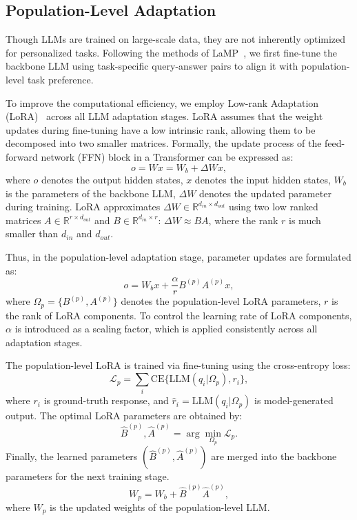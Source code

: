 \documentclass[11pt]{article}
\begin{document}
\subsection{Population-Level Adaptation}
Though LLMs are trained on large-scale data, they are not inherently optimized for personalized tasks. 
Following the methods of LaMP~\cite{salemi-etal-2024-lamp}, we first fine-tune the backbone LLM using task-specific query-answer pairs to align it with population-level task preference.

To improve the computational efficiency, we employ Low-rank Adaptation (LoRA)~\cite{hu2022lora} across all LLM adaptation stages.
LoRA assumes that the weight updates during fine-tuning have a low intrinsic rank, allowing them to be decomposed into two smaller matrices. 
Formally, the update process of the feed-forward network (FFN) block in a Transformer can be expressed as:
\begin{equation}
    o = Wx = W_b + \Delta Wx,
\end{equation}
where $o$ denotes the output hidden states, $x$ denotes the input hidden states, $W_b$ is the parameters of the backbone LLM, $\Delta W$ denotes the updated parameter during training.
LoRA approximates $\Delta W \in \mathbb{R}^{d_{in} \times d_{out}}$ using two low ranked matrices $A \in \mathbb{R}^{r \times d_{out}}$ and $B \in \mathbb{R}^{d_{in} \times r}$: $\Delta W \approx BA$, where the rank $r$ is much smaller than $d_{in}$ and $d_{out}$. 

Thus, in the population-level adaptation stage, parameter updates are formulated as:
\begin{equation}
    o = W_b x + \frac{\alpha}{r} B^{(p)} A^{(p)} x,
\end{equation}
where $\Omega_p = \{B^{(p)},A^{(p)}\}$ denotes the population-level LoRA parameters, $r$ is the rank of LoRA components.
To control the learning rate of LoRA components, $\alpha$ is introduced as a scaling factor, which is applied consistently across all adaptation stages.

The population-level LoRA is trained via fine-tuning using the cross-entropy loss:
\begin{equation}
\mathcal{L}_p = \sum_i\text{CE}\{\text{LLM}(q_i|\Omega_p),r_i\}, 
\end{equation}
where $r_i$ is ground-truth response, and $\hat{r}_i=\text{LLM}(q_i|\Omega_p)$ is model-generated output. 
The optimal LoRA parameters are obtained by:
\begin{equation}
\hat{B}^{(p)}, \hat{A}^{(p)} = \arg\min_{\Omega_p} \mathcal{L}_p.
\end{equation}
Finally, the learned parameters $(\hat{B}^{(p)}, \hat{A}^{(p)})$ are merged into the backbone parameters for the next training stage. 
\begin{equation}
    W_p = W_b + \hat{B}^{(p)} \hat{A}^{(p)},
\end{equation}
where $W_p$ is the updated weights of the population-level LLM. 
\end{document}
